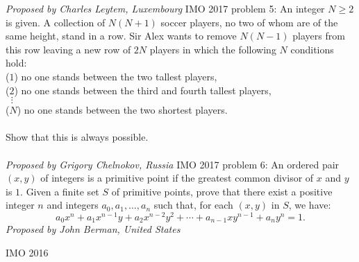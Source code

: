 \textit{Proposed by Charles Leytem, Luxembourg} 
IMO 2017 problem 5:  An integer $N \ge 2$ is given. A collection of $N(N + 1)$ soccer players, no two of whom are of the same height, stand in a row. Sir Alex wants to remove $N(N - 1)$ players from this row leaving a new row of $2N$ players in which the following $N$ conditions hold: \\
($1$) no one stands between the two tallest players, \\
($2$) no one stands between the third and fourth tallest players, \\
$\;\;\vdots$ \\
($N$) no one stands between the two shortest players. \\\\
Show that this is always possible. \\\\
\textit{Proposed by Grigory Chelnokov, Russia} 
IMO 2017 problem 6:  An ordered pair $(x, y)$ of integers is a primitive point if the greatest common divisor of $x$ and $y$ is $1$. Given a finite set $S$ of primitive points, prove that there exist a positive integer $n$ and integers $a_0, a_1, \ldots , a_n$ such that, for each $(x, y)$ in $S$, we have:
\[ a_0x^n + a_1x^{n-1} y + a_2x^{n-2}y^2 + \cdots + a_{n-1}xy^{n-1} + a_ny^n = 1. \]
\textit{Proposed by John Berman, United States} 

IMO 2016 

